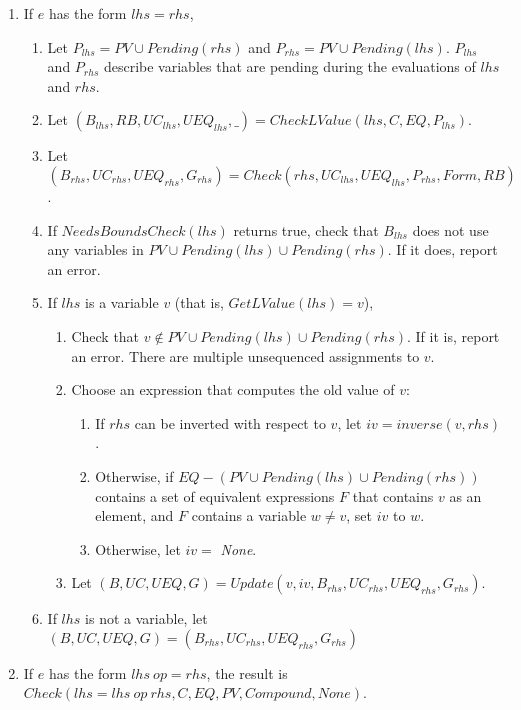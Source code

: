 \begin{enumerate}
\item If $e$ has the form $lhs = rhs$,
\label{list:check-assignment}
\begin{enumerate}
\item Let $P_{lhs} = PV \cup Pending(rhs)$ and $P_{rhs} = PV \cup Pending(lhs).$   $P_{lhs}$
        and $P_{rhs}$ describe variables that are pending during the evaluations of $lhs$ and $rhs$.
\item Let $(B_{lhs}, RB, {UC}_{lhs}, {UEQ}_{lhs}, \_) = CheckLValue(lhs, C, EQ, P_{lhs})$.  
\item Let $(B_{rhs},  {UC}_{rhs}, {UEQ}_{rhs}, G_{rhs}) = 
Check(rhs, {UC}_{lhs}, {UEQ}_{lhs},P_{rhs}, Form, RB)$.
\item If $NeedsBoundsCheck(lhs)$ returns true, check that $B_{lhs}$ does not use any variables in 
$PV \cup Pending(lhs) \cup Pending(rhs)$.  If it does, report an error.
\item  If $lhs$ is a variable $v$ (that is, $GetLValue(lhs) = { v }$),
\begin{enumerate}
\item Check that $v \notin PV \cup Pending(lhs) \cup Pending(rhs)$.  If it is, report an error.  
There are multiple unsequenced assignments to $v$.
\item Choose an expression that computes the old value of $v$:
\begin{enumerate}
\item If $rhs$ can be inverted with respect to $v$, let $iv = inverse(v, rhs)$. 
\item Otherwise, if $EQ - (PV \cup Pending(lhs) \cup Pending(rhs))$ contains a set of equivalent expressions $F$ that contains $v$ as 
an element, and $F$ contains a variable $w \neq v$, set $iv$ to $w$.
\item Otherwise, let $iv = $ {\it None}.
\end{enumerate}
\item Let $(B, UC, UEQ, G) = Update(v, iv, B_{rhs}, UC_{rhs}, UEQ_{rhs}, G_{rhs})$.
\end{enumerate}
\item If $lhs$ is not a variable, let $(B, UC, UEQ, G) = (B_{rhs}, UC_{rhs}, UEQ_{rhs}, G_{rhs})$
\end{enumerate}


\item If $e$ has the form $lhs~op= rhs$, the result is 
$Check (lhs = lhs~op~rhs, C, EQ, PV, Compound, None)$.


\end{enumerate}
